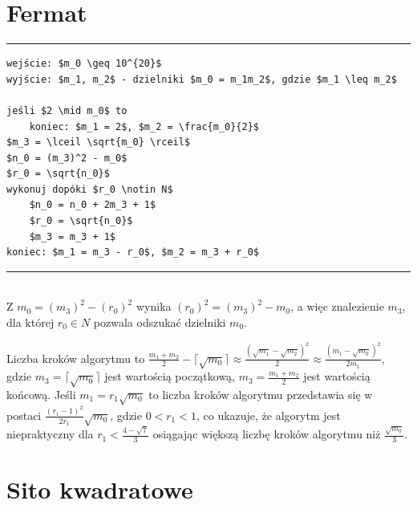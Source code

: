 \section{Fermat}
\noindent\rule{\textwidth}{0.1pt}
\begin{lstlisting}[mathescape=true]
wejście: $m_0 \geq 10^{20}$
wyjście: $m_1, m_2$ - dzielniki $m_0 = m_1m_2$, gdzie $m_1 \leq m_2$

jeśli $2 \mid m_0$ to
	koniec: $m_1 = 2$, $m_2 = \frac{m_0}{2}$
$m_3 = \lceil \sqrt{m_0} \rceil$
$n_0 = (m_3)^2 - m_0$
$r_0 = \sqrt{n_0}$
wykonuj dopóki $r_0 \notin N$
	$n_0 = n_0 + 2m_3 + 1$
	$r_0 = \sqrt{n_0}$
	$m_3 = m_3 + 1$
koniec: $m_1 = m_3 - r_0$, $m_2 = m_3 + r_0$
\end{lstlisting}
\noindent\rule{\textwidth}{0.1pt}
\\

Z $m_0 = (m_3)^2 - (r_0)^2$ wynika $(r_0)^2 = (m_3)^2 - m_0$, a więc znalezienie $m_3$, dla której $r_0 \in N$ pozwala odszukać dzielniki $m_0$. 

Liczba kroków algorytmu to $\frac{m_1 + m_2}{2} - \lceil \sqrt{m_0} \rceil \approx \frac{(\sqrt{m_1} - \sqrt{m_2})^2}{2} \approx \frac{(m_1 - \sqrt{m_0})^2}{2m_1}$, gdzie $m_3 = \lceil \sqrt{m_0} \rceil$ jest wartością początkową, $m_3 = \frac{m_1 + m_2}{2}$ jest wartością końcową. Jeśli $m_1 = r_1\sqrt{m_0}$ to liczba kroków algorytmu przedstawia się w postaci $\frac{(r_1-1)^2}{2r_1}\sqrt{m_0}$, gdzie $0 < r_1 < 1$, co ukazuje, że algorytm jest niepraktyczny dla $r_1 < \frac{4 - \sqrt{7}}{3}$ osiągając większą liczbę kroków algorytmu niż $\frac{\sqrt{m_0}}{3}$.

\newpage

\section{Sito kwadratowe}

